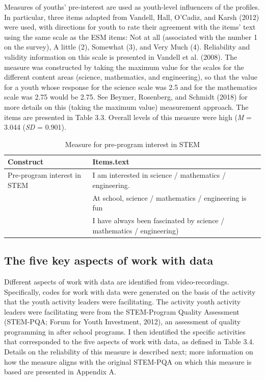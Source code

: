 \documentclass[]{book}
\theoremstyle{definition}
\theoremstyle{definition}
\theoremstyle{definition}
\theoremstyle{remark}
\begin{document}
Measures of youths' pre-interest are used as youth-level influencers of
the profiles. In particular, three items adapted from Vandell, Hall,
O'Cadiz, and Karsh (2012) were used, with directions for youth to rate
their agreement with the items' text using the same scale as the ESM
items: Not at all (associated with the number 1 on the survey), A little
(2), Somewhat (3), and Very Much (4). Reliability and validity
information on this scale is presented in Vandell et al. (2008). The
measure was constructed by taking the maximum value for the scales for
the different content areas (science, mathematics, and engineering), so
that the value for a youth whose response for the science scale was 2.5
and for the mathematics scale was 2.75 would be 2.75. See Beymer,
Rosenberg, and Schmidt (2018) for more details on this (taking the
maximum value) measurement approach. The items are presented in Table
3.3. Overall levels of this measure were high (\emph{M} = 3.044
(\emph{SD} = 0.901).

\begin{landscape}\begin{table}

\caption{\label{tab:unnamed-chunk-5}Measure for pre-program interest in STEM}
\centering
\begin{tabular}[t]{ll}
\toprule
Construct & Items.text\\
\midrule
Pre-program interest in STEM & I am interested in science / mathematics / engineering.\\
 & At school, science / mathematics / engineering is fun\\
 & I have always been fascinated by science / mathematics / engineering)\\
\bottomrule
\end{tabular}
\end{table}
\end{landscape}

\subsection{The five key aspects of work with
data}\label{the-five-key-aspects-of-work-with-data}

Different aspects of work with data are identified from
video-recordings. Specifically, codes for work with data were generated
on the basis of the activity that the youth activity leaders were
facilitating. The activity youth activity leaders were facilitating were
from the STEM-Program Quality Assessment (STEM-PQA; Forum for Youth
Investment, 2012), an assessment of quality programming in after school
programs. I then identified the specific activities that corresponded to
the five aspects of work with data, as defined in Table 3.4. Details on
the reliability of this measure is described next; more information on
how the measure aligns with the original STEM-PQA on which this measure
is based are presented in Appendix A.
\end{document}

